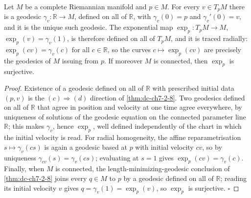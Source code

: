 \begin{lemma}
  \label{lem:dc-ch7-3-expmap-global}
  \leanok
  Let $M$ be a complete Riemannian manifold and $p\in M$. For every $v\in T_pM$ there is a
  geodesic $\gamma_v:\mathbb{R}\to M$, defined on all of $\mathbb{R}$, with $\gamma_v(0)=p$
  and $\gamma_v'(0)=v$, and it is the unique such geodesic. The exponential map
  $\exp_p:T_pM\to M$, $\exp_p(v)=\gamma_v(1)$, is therefore defined on all of $T_pM$, and it
  is traced radially: $\exp_p(cv)=\gamma_v(c)$ for all $c\in\mathbb{R}$, so the curves
  $c\mapsto\exp_p(cv)$ are precisely the geodesics of $M$ issuing from $p$. If moreover $M$
  is connected, then $\exp_p$ is surjective.
\end{lemma}
\begin{proof}
  \leanok
  Existence of a geodesic defined on all of $\mathbb{R}$ with prescribed initial data
  $(p,v)$ is the $(c)\Rightarrow(d)$ direction of \cref{thm:dc-ch7-2-8}. Two geodesics
  defined on all of $\mathbb{R}$ that agree in position and velocity at one time agree
  everywhere, by uniqueness of solutions of the geodesic equation on the connected parameter
  line $\mathbb{R}$; this makes $\gamma_v$, hence $\exp_p$, well defined independently of the
  chart in which the initial velocity is read. For radial homogeneity, the affine
  reparametrisation $s\mapsto\gamma_v(cs)$ is again a geodesic based at $p$ with initial
  velocity $cv$, so by uniqueness $\gamma_{cv}(s)=\gamma_v(cs)$; evaluating at $s=1$ gives
  $\exp_p(cv)=\gamma_v(c)$. Finally, when $M$ is connected, the length-minimizing-geodesic
  conclusion of \cref{thm:dc-ch7-2-8} joins every $q\in M$ to $p$ by a geodesic defined on
  all of $\mathbb{R}$; reading its initial velocity $v$ gives $q=\gamma_v(1)=\exp_p(v)$, so
  $\exp_p$ is surjective. $\square$
\end{proof}

